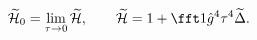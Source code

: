 \begin{equation}
\widetilde{\cal H}_0=\lim_{\tau\to0}\widetilde{\cal H},\qquad
\widetilde{\cal H}=1+\fft1{\hat g^4\tau^4\widetilde\Delta}.
\end{equation}

